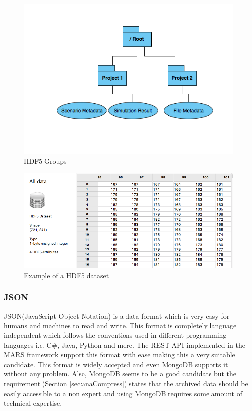 \begin{figure}[H]
    \centering \includegraphics[scale=0.6]{grafiken/groupsHDF5.png}
    \caption{HDF5 Groups \cite{HDF5}}
    \label{fig:HDF5}
\end{figure}

\begin{figure}[H]
    \centering \includegraphics[scale=0.45]{grafiken/dataset.png}
    \caption{Example of a HDF5 dataset}
    \label{fig:dataset}
\end{figure}

\subsubsection{JSON} 
JSON(JavaScript Object Notation) is a data format which is very easy for humans and machines to read and write. This format is
completely language independent which follows the conventions used in different programming languages i.e. C\#, Java, Python and more. The REST API implemented in the
MARS framework support this format with ease making this a very suitable candidate. This format is widely 
accepted and even MongoDB supports it without any problem. Also, MongoDB seems to be a good candidate but the requirement (Section \ref{sec:anaCompress}) states that the archived
data should be easily accessible to a non expert and using MongoDB requires some amount of technical expertise.


